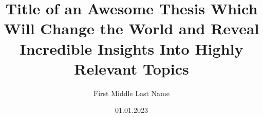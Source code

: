 \documentclass[
    language=english, %
    thesis=master, %
    chair=datascience, %
    supervisor=supervisor, %
    license=cc-by-sa, %
    multiauthor=false, %
    ]{settings/statopt-thesis}
\title{Title of an Awesome Thesis Which Will Change the World and Reveal Incredible Insights Into Highly Relevant Topics}
\author{First Middle Last Name}
\date{01.01.2023}
\begin{document}
    \maketitle


    \tableofcontents

    
	
	\begin{content}
    	
    	
        
    	

        \begin{appendix}
            
        \end{appendix}
    \end{content}

    \begin{backmatter}
        \begingroup
        \setlength{\emergencystretch}{.5em}
        \printbibliography[
            heading=bibintoc,
            title={Bibliography}
        ]
        \endgroup
        \declaration
        \consent
    \end{backmatter}

\end{document}
